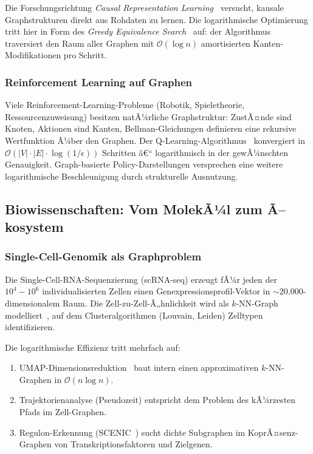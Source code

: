 ﻿\documentclass[12pt,a4paper,twoside]{article}
\theoremstyle{definition}
\theoremstyle{plain}
\theoremstyle{remark}
\begin{document}
Die Forschungsrichtung \emph{Causal Representation Learning}~\cite{Scholkopf2021}
versucht, kausale Graphstrukturen direkt aus Rohdaten zu
lernen.  Die logarithmische Optimierung tritt hier in Form
des \emph{Greedy Equivalence Search}~\cite{Chickering2002}
auf: der Algorithmus traversiert den Raum aller Graphen mit
$\mathcal{O}(\log n)$ amortisierten Kanten-Modifikationen pro Schritt.

\subsubsection{Reinforcement Learning auf Graphen}

Viele Reinforcement-Learning-Probleme (Robotik, Spieletheorie,
Ressourcenzuweisung) besitzen natÃ¼rliche Graphstruktur:
ZustÃ¤nde sind Knoten, Aktionen sind Kanten,
Bellman-Gleichungen definieren eine rekursive Wertfunktion
Ã¼ber den Graphen.  Der Q-Learning-Algorithmus~\cite{Watkins1992}
konvergiert in $\mathcal{O}(|V| \cdot |E| \cdot \log(1/\epsilon))$
Schritten â€“ logarithmisch in der gewÃ¼nschten Genauigkeit.
Graph-basierte Policy-Darstellungen versprechen eine weitere
logarithmische Beschleunigung durch strukturelle Ausnutzung.

\subsection{Biowissenschaften: Vom MolekÃ¼l zum Ã–kosystem}
\label{sub:bio}

\subsubsection{Single-Cell-Genomik als Graphproblem}

Die Single-Cell-RNA-Sequenzierung (scRNA-seq) erzeugt fÃ¼r
jeden der $10^4{-}10^6$ individualisierten Zellen einen
Genexpressionsprofil-Vektor in $\sim 20.000$-dimensionalem
Raum.  Die Zell-zu-Zell-Ã„hnlichkeit wird als $k$-NN-Graph
modelliert~\cite{Wolf2018}, auf dem Clusteralgorithmen
(Louvain, Leiden) Zelltypen identifizieren.

Die logarithmische Effizienz tritt mehrfach auf:
\begin{enumerate}
  \item UMAP-Dimensionsreduktion~\cite{McInnes2018} baut
        intern einen approximativen $k$-NN-Graphen in
        $\mathcal{O}(n \log n)$.
  \item Trajektorienanalyse (Pseudozeit) entspricht dem
        Problem des kÃ¼rzesten Pfads im Zell-Graphen.
  \item Regulon-Erkennung (SCENIC~\cite{Aibar2017}) sucht
        dichte Subgraphen im KoprÃ¤senz-Graphen von
        Transkriptionsfaktoren und Zielgenen.
\end{enumerate}
\end{document}
